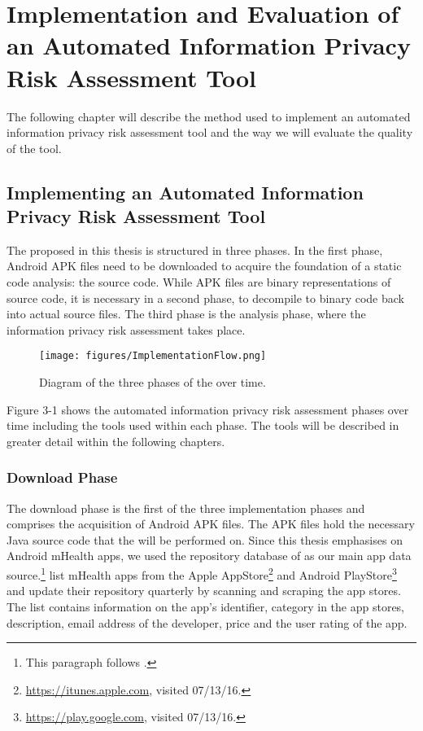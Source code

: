 \section{Implementation and Evaluation of an Automated Information Privacy Risk Assessment Tool}

The following chapter will describe the method used to implement an automated information privacy risk assessment tool and the way we will evaluate the quality of the tool.

\subsection{Implementing an Automated Information Privacy Risk Assessment Tool}

The \aiprat proposed in this thesis is structured in three phases.
In the first phase, Android APK files need to be downloaded to acquire the foundation of a static code analysis: the source code.
While APK files are binary representations of source code, it is necessary in a second phase, to decompile to binary code back into actual source files.
The third phase is the analysis phase, where the information privacy risk assessment takes place.

\begin{figure}[h]
	\label{fig:implementationPhases}
	\centering
	\texttt{[image: figures/ImplementationFlow.png]}
	\caption{Diagram of the three phases of the \aiprat over time.}
\end{figure}

Figure 3-1 shows the automated information privacy risk assessment phases over time including the tools used within each phase. 
The tools will be described in greater detail within the following chapters.

\subsubsection{Download Phase}

The download phase is the first of the three implementation phases and comprises the acquisition of Android APK files. 
The APK files hold the necessary Java source code that the \sca will be performed on.
Since this thesis emphasises on Android mHealth apps, we used the repository database of \cite{Xu2015} as our main app data source.\footnote{This paragraph follows \cite{Xu2015}.}
\cite{Xu2015} list mHealth apps from the Apple AppStore\footnote{\url{https://itunes.apple.com}, visited 07/13/16.} and Android PlayStore\footnote{\url{https://play.google.com}, visited 07/13/16.} and update their repository quarterly by scanning and scraping the app stores.
The list contains information on the app's identifier, category in the app stores, description, email address of the developer, price and the user rating of the app.

